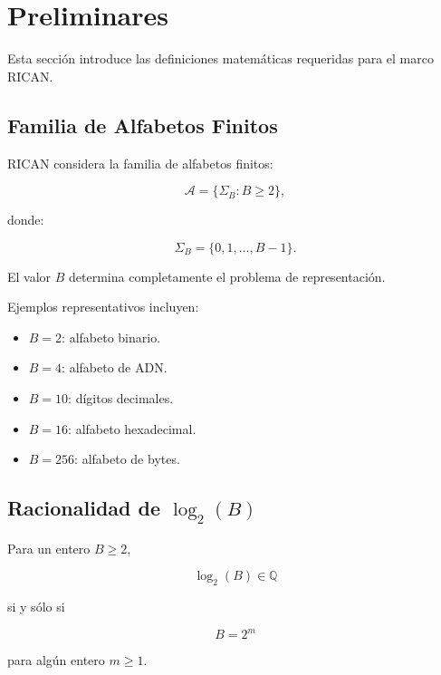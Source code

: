 \documentclass[onecolumn]{IEEEtran}
\begin{document}

\section{Preliminares}

Esta sección introduce las definiciones matemáticas requeridas para el
marco RICAN.

\subsection{Familia de Alfabetos Finitos}

RICAN considera la familia de alfabetos finitos:

\[
\mathcal{A}
=
\{\Sigma_B:B\geq2\},
\]

donde:

\[
\Sigma_B=
\{0,1,\ldots,B-1\}.
\]

El valor $B$ determina completamente el problema de representación.

Ejemplos representativos incluyen:

\begin{itemize}

\item $B=2$: alfabeto binario.

\item $B=4$: alfabeto de ADN.

\item $B=10$: dígitos decimales.

\item $B=16$: alfabeto hexadecimal.

\item $B=256$: alfabeto de bytes.

\end{itemize}

\subsection{Racionalidad de $\log_2(B)$}

\begin{lemma}
\label{lem:rationality}

Para un entero $B\geq2$,

\[
\log_2(B)\in\mathbb{Q}
\]

si y sólo si

\[
B=2^m
\]

para algún entero $m\geq1$.

\end{lemma}
\end{document}
